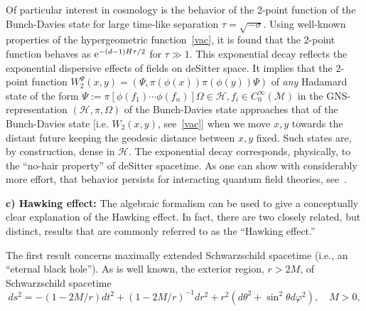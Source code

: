 \documentclass[12pt]{article}
\newcommand{\eH}{\mathscr{H}}
\newcommand{\M}{\mathscr{M}}
\newcommand{\e}{{\rm e}}
\theoremstyle{plain}
\theoremstyle{definition}
\def\ben{\begin{equation}}
\def\een{\end{equation}}
\begin{document}
Of particular interest in cosmology is the behavior of the 2-point function of the Bunch-Davies state for large
time-like separation $\tau = \sqrt{-\sigma}$.  Using well-known properties of the hypergeometric function~\eqref{vac},
it is found that the 2-point function behaves as $\e^{-(d-1)H\tau/2}$ for $\tau \gg 1$. This exponential decay reflects the
exponential dispersive effects of fields on deSitter space. It implies that the 2-point function $W^\Psi_2(x,y) = (\Psi, \pi(\phi(x)) \pi(\phi(y)) \Psi)$ of
{\em any} Hadamard state of the form $\Psi := \pi[\phi(f_1) \cdots  \phi(f_n)]\Omega \in \eH, f_i \in C_0^\infty(\M)$ in the GNS-representation 
$(\eH, \pi, \Omega)$ of the Bunch-Davies state 
 approaches that of the Bunch-Davies state [i.e. $W_2(x,y)$, see~\eqref{vac}] when we move $x,y$ towards the distant future keeping the geodesic distance between $x,y$
fixed. Such states are, by construction, dense in $\eH$. The exponential decay corresponds,
physically, to the ``no-hair property'' of deSitter spacetime. As one can show with
considerably more effort, that behavior persists for interacting quantum field theories, see~\cite{h1,h2,marolf1,marolf2}.

\vspace{.5cm}

{\bf c) Hawking effect:}
The algebraic formalism can be used to give a conceptually clear
explanation of the Hawking effect. In fact, there are two closely related, but
distinct, results that are commonly referred to as the ``Hawking effect.''

The first result concerns maximally extended Schwarzschild spacetime (i.e., an ``eternal black hole'').
As is well known, the exterior region, $r>2M$, of
Schwarzschild spacetime
\ben
ds^2 = -(1-2M/r)dt^2 + (1-2M/r)^{-1}dr^2 + r^2(d\theta^2 + \sin^2
\theta d\varphi^2), \quad M > 0,
\een
\end{document}
